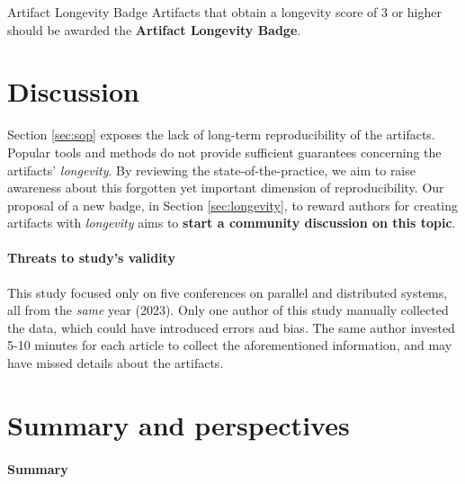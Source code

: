 \documentclass[sigconf,natbib=false]{acmart}
\newcommand{\todo}[1]{{\color{red}{TODO: #1}}}
\begin{document}
\begin{recommendation*}{Artifact Longevity Badge}{}
  Artifacts that obtain a longevity score of 3 or higher should be awarded the \textbf{Artifact Longevity Badge}. 
\end{recommendation*}



\section{Discussion}\label{sec:discussion}

Section \ref{sec:sop} exposes the lack of long-term reproducibility of the artifacts.
Popular tools and methods do not provide sufficient guarantees concerning the artifacts' \emph{longevity}.
By reviewing the state-of-the-practice, we aim to raise awareness about this forgotten yet important dimension of reproducibility.
Our proposal of a new badge, in Section \ref{sec:longevity}, to reward authors for creating artifacts with \emph{longevity} aims to \textbf{start a community discussion on this topic}.


\paragraph{Threats to study's validity}

This study focused only on five conferences on parallel and distributed systems, all from the \emph{same} year (2023).
Only one author of this study manually collected the data, which could have introduced errors and bias.
The same author invested 5-10 minutes for each article to collect the aforementioned information, and may have missed details about the artifacts.


\section{Summary and perspectives}\label{sec:conclu}

\paragraph{Summary}
\end{document}
